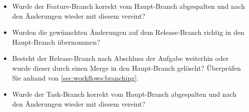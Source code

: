 \begin{itemize}
    \item Wurde der Feature\hyp Branch korrekt vom Haupt\hyp Branch abgespalten und nach den Änderungen wieder mit diesem vereint?
    
    \item Wurden die gewünschten Änderungen auf dem Release\hyp Branch richtig in den Haupt\hyp Branch übernommen?
    
    \item Besteht der Release\hyp Branch nach Abschluss der Aufgabe weiterhin oder wurde dieser durch einen Merge in den Haupt\hyp Branch gelöscht? Überprüfen Sie anhand von \autoref{sec:workflows:branching}.
    
    \item Wurde der Task\hyp Branch korrekt vom Haupt\hyp Branch abgespalten und nach den Änderungen wieder mit diesem vereint?
\end{itemize}
